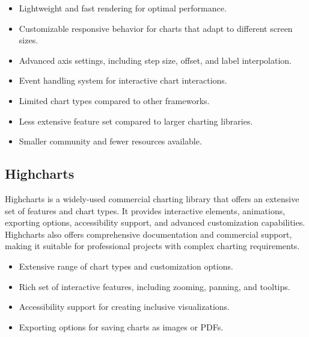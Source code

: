 \documentclass[a4paper, 11pt]{article}
\begin{document}
{\selectfont\large\mdseries\color{MSBlue}{ Main features:}}
\begin{itemize}[noitemsep,nolistsep]
  \item Lightweight and fast rendering for optimal performance.
  \item Customizable responsive behavior for charts that adapt to different screen sizes.
  \item Advanced axis settings, including step size, offset, and label interpolation.
  \item Event handling system for interactive chart interactions.
\end{itemize}\par

\medbreak
{\selectfont\large\mdseries\color{MSBlue}{ Main cons:}}
\begin{itemize}[noitemsep,nolistsep]
  \item Limited chart types compared to other frameworks.
  \item Less extensive feature set compared to larger charting libraries.
  \item Smaller community and fewer resources available.
\end{itemize}

\subsection{Highcharts}
Highcharts is a widely-used commercial charting library that offers an extensive set of features and chart types. It provides interactive elements, animations, exporting options, accessibility support, and advanced customization capabilities. Highcharts also offers comprehensive documentation and commercial support, making it suitable for professional projects with complex charting requirements.\par
\medbreak


{\selectfont\large\mdseries\color{MSBlue}{ Main features:}}
\begin{itemize}[noitemsep,nolistsep]
  \item Extensive range of chart types and customization options.
  \item Rich set of interactive features, including zooming, panning, and tooltips.
  \item Accessibility support for creating inclusive visualizations.
  \item Exporting options for saving charts as images or PDFs.
\end{itemize}\par
\end{document}
